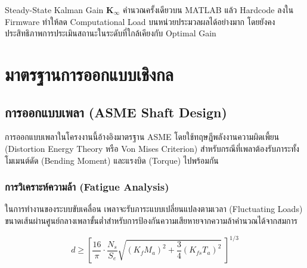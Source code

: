 \noindent Steady-State Kalman Gain $\mathbf{K}_\infty$ คำนวณครั้งเดียวบน MATLAB
แล้ว Hardcode ลงใน Firmware ทำให้ลด Computational Load บนหน่วยประมวลผลได้อย่างมาก โดยยังคงประสิทธิภาพการประเมินสถานะในระดับที่ใกล้เคียงกับ Optimal Gain

\section{มาตรฐานการออกแบบเชิงกล}
\label{sec:mech_standards}

\subsection{การออกแบบเพลา (ASME Shaft Design)}
\label{subsec:shaft_design}

การออกแบบเพลาในโครงงานนี้อ้างอิงมาตรฐาน ASME โดยใช้ทฤษฎีพลังงานความผิดเพี้ยน (Distortion Energy Theory หรือ Von Mises Criterion) สำหรับกรณีที่เพลาต้องรับภาระทั้งโมเมนต์ดัด (Bending Moment) และแรงบิด (Torque) ไปพร้อมกัน 


\subsubsection{การวิเคราะห์ความล้า (Fatigue Analysis)}

ในการทำงานของระบบขับเคลื่อน เพลาจะรับภาระแบบเปลี่ยนแปลงตามเวลา (Fluctuating Loads) ขนาดเส้นผ่านศูนย์กลางเพลาขั้นต่ำสำหรับการป้องกันความเสียหายจากความล้าคำนวณได้จากสมการ

\begin{equation}
    d \geq \left[\frac{16}{\pi}\cdot\frac{N_s}{S_e}
    \sqrt{\left(K_f M_a\right)^2 + \frac{3}{4}\left(K_{fs} T_a\right)^2}
    \;\right]^{1/3}
    \label{eq:shaft_diameter_fatigue}
\end{equation}

